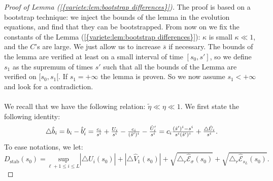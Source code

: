 \documentclass[11pt,a4paper,reqno]{amsart}
\theoremstyle{remark}
\numberwithin{equation}{section}
\begin{document}
\begin{proof}[Proof of Lemma {{\rm (\ref{{variete:lem:bootstrap differences}})}}]
The proof is based on a bootstrap technique: we inject the bounds of the lemma in the evolution equations, and find that they can be bootstrapped. From now on we fix the constants of the Lemma {{\rm (\ref{{variete:lem:bootstrap differences}})}}: $\kappa$ is small $\kappa\ll 1$, and the $C$'s are large. We just allow us to increase ${{\overline {s}}}$ if necessary. The bounds of the lemma are verified at least on a small interval of time $[s_0,s']$, so we define $s_1$ as the supremum of times $s'$ such that all the bounds of the Lemma are verified on $[s_0,s_1[$. If $s_1=+\infty$ the lemma is proven. So we now assume $s_1<+\infty$ and look for a contradiction.\\
\\
We recall that we have the following relation: $ \tilde{\eta}\ll \eta \ll 1 $. We first state the following identity:
\begin{equation} \label{variete:bootstrap:eq:expression trianglehatbi}
\begin{array}{r c l}
\triangle \hat{b}_i= b_i-\hat{b}_i'=\frac{c_i}{s^i}+\frac{U_i}{s^i}-\frac{c_i}{(\hat{s}')^i}-\frac{\hat{U}'_i}{s^i}=c_i\frac{(\hat{s}')^i-s^i}{s^i (\hat{s}')^i}+\frac{\triangle \hat{U}_i}{s^i}.
\end{array}
\end{equation}
To ease notations, we let:
$$
D_{\text{stab}}(s_0)= \underset{\ell+1\leq i \leq L}{\text{sup}}|\triangle \hat{U}_i(s_0)| + |\triangle \hat{V}_1(s_0)|+\sqrt{\triangle_r \hat{\mathcal{E}}_{\sigma}(s_0)}+\sqrt{\triangle_r \hat{\mathcal{E}}_{s_L}(s_0)}.
$$


\end{proof}
\end{document}
